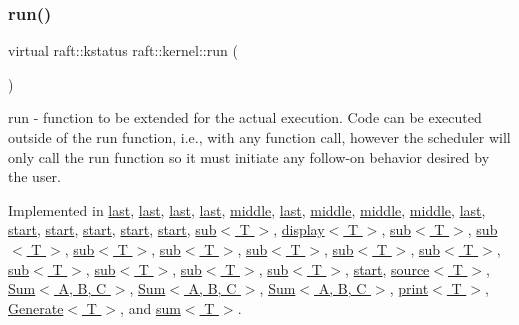 \subsubsection{\texorpdfstring{run()}{run()}}
{\footnotesize\ttfamily virtual raft\+::kstatus raft\+::kernel\+::run (\begin{DoxyParamCaption}{ }\end{DoxyParamCaption})\hspace{0.3cm}{\ttfamily [pure virtual]}}

run -\/ function to be extended for the actual execution. Code can be executed outside of the run function, i.\+e., with any function call, however the scheduler will only call the run function so it must initiate any follow-\/on behavior desired by the user. 

Implemented in \hyperlink{classlast_a7a1da1c30f571a8e8ccb515ca2cb2f02}{last}, \hyperlink{classlast_a7a1da1c30f571a8e8ccb515ca2cb2f02}{last}, \hyperlink{classlast_a7a1da1c30f571a8e8ccb515ca2cb2f02}{last}, \hyperlink{classlast_a7a1da1c30f571a8e8ccb515ca2cb2f02}{last}, \hyperlink{classmiddle_a9aa7415c102af751be9c7af4771b6f16}{middle}, \hyperlink{classlast_a7a1da1c30f571a8e8ccb515ca2cb2f02}{last}, \hyperlink{classmiddle_a9aa7415c102af751be9c7af4771b6f16}{middle}, \hyperlink{classmiddle_a9aa7415c102af751be9c7af4771b6f16}{middle}, \hyperlink{classmiddle_a9aa7415c102af751be9c7af4771b6f16}{middle}, \hyperlink{classlast_a7a1da1c30f571a8e8ccb515ca2cb2f02}{last}, \hyperlink{classstart_a4c076d756e2846f51e54452853a9ed6d}{start}, \hyperlink{classstart_a4c076d756e2846f51e54452853a9ed6d}{start}, \hyperlink{classstart_a4c076d756e2846f51e54452853a9ed6d}{start}, \hyperlink{classstart_a4c076d756e2846f51e54452853a9ed6d}{start}, \hyperlink{classstart_a4c076d756e2846f51e54452853a9ed6d}{start}, \hyperlink{classsub_a0a0c7461433ee8b5f4b24305282bf69a}{sub$<$ T $>$}, \hyperlink{classdisplay_a8652ca329ee5d1650e183b17f7299b51}{display$<$ T $>$}, \hyperlink{classsub_a0a0c7461433ee8b5f4b24305282bf69a}{sub$<$ T $>$}, \hyperlink{classsub_a0a0c7461433ee8b5f4b24305282bf69a}{sub$<$ T $>$}, \hyperlink{classsub_a0a0c7461433ee8b5f4b24305282bf69a}{sub$<$ T $>$}, \hyperlink{classsub_a0a0c7461433ee8b5f4b24305282bf69a}{sub$<$ T $>$}, \hyperlink{classsub_a0a0c7461433ee8b5f4b24305282bf69a}{sub$<$ T $>$}, \hyperlink{classsub_a0a0c7461433ee8b5f4b24305282bf69a}{sub$<$ T $>$}, \hyperlink{classsub_a0a0c7461433ee8b5f4b24305282bf69a}{sub$<$ T $>$}, \hyperlink{classsub_a0a0c7461433ee8b5f4b24305282bf69a}{sub$<$ T $>$}, \hyperlink{classsub_a0a0c7461433ee8b5f4b24305282bf69a}{sub$<$ T $>$}, \hyperlink{classsub_a0a0c7461433ee8b5f4b24305282bf69a}{sub$<$ T $>$}, \hyperlink{classsub_a0a0c7461433ee8b5f4b24305282bf69a}{sub$<$ T $>$}, \hyperlink{classstart_a4c076d756e2846f51e54452853a9ed6d}{start}, \hyperlink{classsource_ad144988607882cbe591a4c71642cb77a}{source$<$ T $>$}, \hyperlink{class_sum_ab915892675d11a8f3f0de2e7f96b0d28}{Sum$<$ A, B, C $>$}, \hyperlink{class_sum_ab915892675d11a8f3f0de2e7f96b0d28}{Sum$<$ A, B, C $>$}, \hyperlink{class_sum_ab915892675d11a8f3f0de2e7f96b0d28}{Sum$<$ A, B, C $>$}, \hyperlink{classprint_aa547f61c584b4044e4a0dfc2410e5adc}{print$<$ T $>$}, \hyperlink{class_generate_aa8253370207e1457b9b79e62253c2925}{Generate$<$ T $>$}, and \hyperlink{classsum_a2d0fac9129b826678d00520621937b15}{sum$<$ T $>$}.

